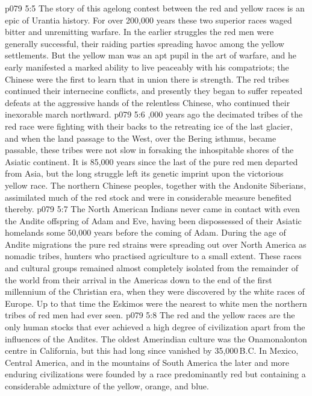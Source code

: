 \vs p079 5:5 The story of this agelong contest between the red and yellow races is an epic of Urantia history. For over 200,000 years these two superior races waged bitter and unremitting warfare. In the earlier struggles the red men were generally successful, their raiding parties spreading havoc among the yellow settlements. But the yellow man was an apt pupil in the art of warfare, and he early manifested a marked ability to live peaceably with his compatriots; the Chinese were the first to learn that in union there is strength. The red tribes continued their internecine conflicts, and presently they began to suffer repeated defeats at the aggressive hands of the relentless Chinese, who continued their inexorable march northward.
\vs p079 5:6 ,000 years ago the decimated tribes of the red race were fighting with their backs to the retreating ice of the last glacier, and when the land passage to the West, over the Bering isthmus, became passable, these tribes were not slow in forsaking the inhospitable shores of the Asiatic continent. It is 85,000 years since the last of the pure red men departed from Asia, but the long struggle left its genetic imprint upon the victorious yellow race. The northern Chinese peoples, together with the Andonite Siberians, assimilated much of the red stock and were in considerable measure benefited thereby.
\vs p079 5:7 The North American Indians never came in contact with even the Andite offspring of Adam and Eve, having been dispossessed of their Asiatic homelands some 50,000 years before the coming of Adam. During the age of Andite migrations the pure red strains were spreading out over North America as nomadic tribes, hunters who practised agriculture to a small extent. These races and cultural groups remained almost completely isolated from the remainder of the world from their arrival in the Americas down to the end of the first millennium of the Christian era, when they were discovered by the white races of Europe. Up to that time the Eskimos were the nearest to white men the northern tribes of red men had ever seen.
\vs p079 5:8 The red and the yellow races are the only human stocks that ever achieved a high degree of civilization apart from the influences of the Andites. The oldest Amerindian culture was the Onamonalonton centre in California, but this had long since vanished by 35,000\,B.C. In Mexico, Central America, and in the mountains of South America the later and more enduring civilizations were founded by a race predominantly red but containing a considerable admixture of the yellow, orange, and blue.
